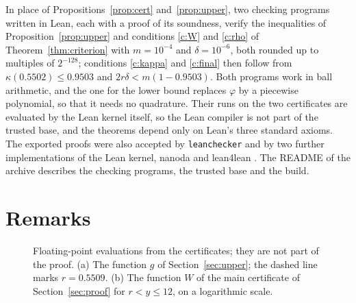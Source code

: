 \documentclass[11pt]{amsart}
\theoremstyle{definition}
\theoremstyle{remark}
\numberwithin{equation}{section}
\newcommand{\rdec}{0.5502}
\newcommand{\rPdec}{0.5509}
\newcommand{\lowKappa}{0.9503}
\newcommand{\lowM}{10^{-4}}
\newcommand{\lowDelta}{10^{-6}}
\begin{document}
In place of Propositions~\ref{prop:cert} and~\ref{prop:upper}, two checking programs written in Lean, each with a proof of its soundness, verify the inequalities of Proposition~\ref{prop:upper} and conditions \ref{c:W} and \ref{c:rho} of Theorem~\ref{thm:criterion} with $m=\lowM$ and $\delta=\lowDelta$, both rounded up to multiples of $2^{-128}$; conditions \ref{c:kappa} and \ref{c:final} then follow from $\kappa(\rdec)\le\lowKappa$ and $2r\delta<m(1-\lowKappa)$. Both programs work in ball arithmetic, and the one for the lower bound replaces $\varphi$ by a piecewise polynomial, so that it needs no quadrature. Their runs on the two certificates are evaluated by the Lean kernel itself, so the Lean compiler is not part of the trusted base, and the theorems depend only on Lean's three standard axioms. The exported proofs were also accepted by \texttt{leanchecker} and by two further implementations of the Lean kernel, nanoda \cite{nanoda} and lean4lean \cite{Car24}. The README of the archive describes the checking programs, the trusted base and the build.

\section{Remarks}\label{sec:remarks}

\begin{figure}[t]
\centering
{}
\caption{Floating-point evaluations from the certificates; they are not part of the proof. (a) The function $g$ of Section~\ref{sec:upper}; the dashed line marks $r=\rPdec$. (b) The function $W$ of the main certificate of Section~\ref{sec:proof} for $r<y\le12$, on a logarithmic scale.}\label{fig:gW}
\end{figure}
\end{document}

